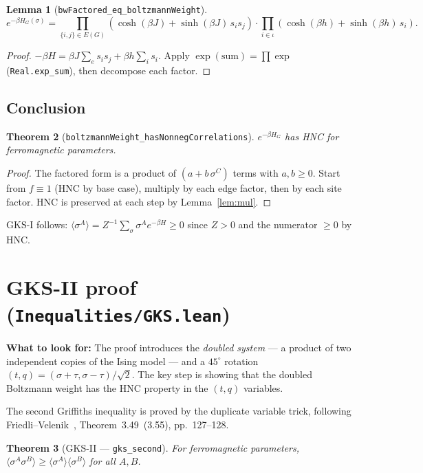 \documentclass[a4paper,11pt]{article}
\newtheorem{theorem}{Theorem}
\newtheorem{lemma}[theorem]{Lemma}
\begin{document}
\begin{lemma}[\texttt{bwFactored\_eq\_boltzmannWeight}]
\[
  e^{-\beta H_G(\sigma)}
  = \prod_{\{i,j\} \in E(G)} (\cosh(\beta J) + \sinh(\beta J)\,s_i s_j)
  \cdot \prod_{i \in \iota} (\cosh(\beta h) + \sinh(\beta h)\,s_i).
\]
\end{lemma}

\begin{proof}
$-\beta H = \beta J \sum_e s_i s_j + \beta h \sum_i s_i$.
Apply $\exp(\text{sum}) = \prod\exp$ (\texttt{Real.exp\_sum}),
then decompose each factor.
\end{proof}

\subsection{Conclusion}

\begin{theorem}[\texttt{boltzmannWeight\_hasNonnegCorrelations}]
$e^{-\beta H_G}$ has HNC for ferromagnetic parameters.
\end{theorem}

\begin{proof}
The factored form is a product of $(a+b\,\sigma^C)$ terms with
$a,b \geq 0$. Start from $f \equiv 1$ (HNC by base case),
multiply by each edge factor, then by each site factor. HNC is
preserved at each step by Lemma~\ref{lem:mul}.
\end{proof}

\noindent
GKS-I follows: $\langle \sigma^A \rangle
= Z^{-1}\sum_\sigma \sigma^A e^{-\beta H} \geq 0$
since $Z > 0$ and the numerator $\geq 0$ by HNC.

\section{GKS-II proof (\texttt{Inequalities/GKS.lean})}

\noindent\textbf{What to look for:} The proof introduces the
\emph{doubled system} --- a product of two independent copies of the
Ising model --- and a $45^\circ$ rotation $(t, q) = (\sigma + \tau,
\sigma - \tau)/\sqrt{2}$. The key step is showing that the doubled
Boltzmann weight has the HNC property in the $(t, q)$ variables.

The second Griffiths inequality is proved by the duplicate variable trick,
following Friedli--Velenik~\cite{friedli-velenik}, Theorem~3.49~(3.55),
pp.~127--128.

\begin{theorem}[GKS-II --- \texttt{gks\_second}]
For ferromagnetic parameters,
$\langle\sigma^A\sigma^B\rangle \geq \langle\sigma^A\rangle\langle\sigma^B\rangle$
for all $A, B$.
\end{theorem}
\end{document}
